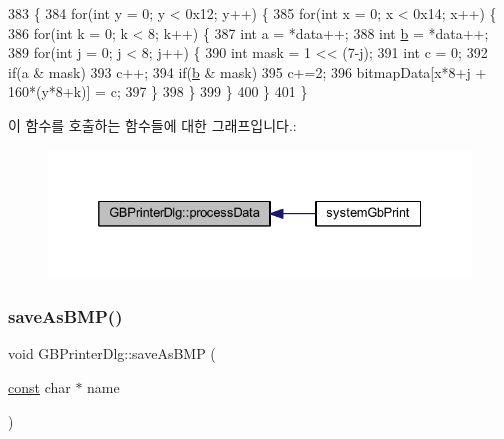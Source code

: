 \begin{DoxyCode}
383 \{
384   \textcolor{keywordflow}{for}(\textcolor{keywordtype}{int} y = 0; y < 0x12; y++) \{
385     \textcolor{keywordflow}{for}(\textcolor{keywordtype}{int} x = 0; x < 0x14; x++) \{
386       \textcolor{keywordflow}{for}(\textcolor{keywordtype}{int} k = 0; k < 8; k++) \{
387         \textcolor{keywordtype}{int} a = *data++;
388         \textcolor{keywordtype}{int} \mbox{\hyperlink{expr-lex_8cpp_a91b64995742fd30063314f12340b4b5a}{b}} = *data++;
389         \textcolor{keywordflow}{for}(\textcolor{keywordtype}{int} j = 0; j < 8; j++) \{
390           \textcolor{keywordtype}{int} mask = 1 << (7-j);
391           \textcolor{keywordtype}{int} c = 0;
392           \textcolor{keywordflow}{if}(a & mask)
393             c++;
394           \textcolor{keywordflow}{if}(\mbox{\hyperlink{expr-lex_8cpp_a91b64995742fd30063314f12340b4b5a}{b}} & mask)
395             c+=2;
396           bitmapData[x*8+j + 160*(y*8+k)] = c;
397         \}
398       \}
399     \}
400   \}  
401 \}
\end{DoxyCode}
이 함수를 호출하는 함수들에 대한 그래프입니다.\+:
\nopagebreak
\begin{figure}[H]
\begin{center}
\leavevmode
\includegraphics[width=332pt]{class_g_b_printer_dlg_a9dcd976e6386374b0f2c70af0b09a43e_icgraph}
\end{center}
\end{figure}
\mbox{\label{class_g_b_printer_dlg_a49404740bed8928cf83d77acb9dcaf83}} 
\subsubsection{\texorpdfstring{save\+As\+B\+M\+P()}{saveAsBMP()}}
{\footnotesize\ttfamily void G\+B\+Printer\+Dlg\+::save\+As\+B\+MP (\begin{DoxyParamCaption}\item[{\mbox{\hyperlink{getopt1_8c_a2c212835823e3c54a8ab6d95c652660e}{const}} char $\ast$}]{name }\end{DoxyParamCaption})}



